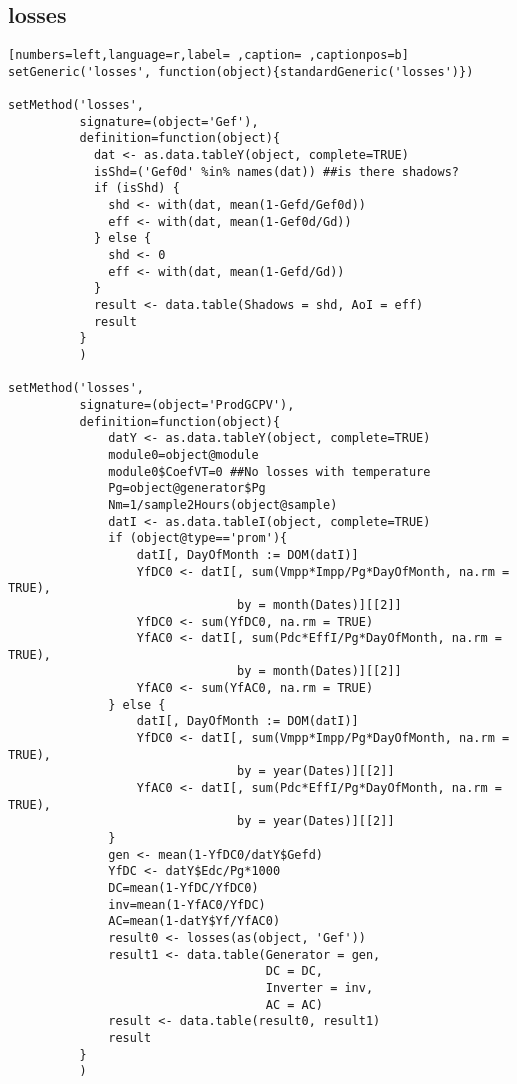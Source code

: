 \subsection{losses}
\label{sec:org82867e5}
\begin{lstlisting}[numbers=left,language=r,label= ,caption= ,captionpos=b]
setGeneric('losses', function(object){standardGeneric('losses')})

setMethod('losses',
          signature=(object='Gef'),
          definition=function(object){
            dat <- as.data.tableY(object, complete=TRUE)
            isShd=('Gef0d' %in% names(dat)) ##is there shadows?
            if (isShd) {
              shd <- with(dat, mean(1-Gefd/Gef0d))
              eff <- with(dat, mean(1-Gef0d/Gd))
            } else {
              shd <- 0
              eff <- with(dat, mean(1-Gefd/Gd))
            }
            result <- data.table(Shadows = shd, AoI = eff)
            result
          }
          )

setMethod('losses',
          signature=(object='ProdGCPV'),
          definition=function(object){
              datY <- as.data.tableY(object, complete=TRUE)
              module0=object@module
              module0$CoefVT=0 ##No losses with temperature
              Pg=object@generator$Pg
              Nm=1/sample2Hours(object@sample)
              datI <- as.data.tableI(object, complete=TRUE)
              if (object@type=='prom'){
                  datI[, DayOfMonth := DOM(datI)]
                  YfDC0 <- datI[, sum(Vmpp*Impp/Pg*DayOfMonth, na.rm = TRUE),
                                by = month(Dates)][[2]]
                  YfDC0 <- sum(YfDC0, na.rm = TRUE)
                  YfAC0 <- datI[, sum(Pdc*EffI/Pg*DayOfMonth, na.rm = TRUE),
                                by = month(Dates)][[2]]
                  YfAC0 <- sum(YfAC0, na.rm = TRUE)
              } else {
                  datI[, DayOfMonth := DOM(datI)]
                  YfDC0 <- datI[, sum(Vmpp*Impp/Pg*DayOfMonth, na.rm = TRUE),
                                by = year(Dates)][[2]]
                  YfAC0 <- datI[, sum(Pdc*EffI/Pg*DayOfMonth, na.rm = TRUE),
                                by = year(Dates)][[2]]     
              }
              gen <- mean(1-YfDC0/datY$Gefd)
              YfDC <- datY$Edc/Pg*1000
              DC=mean(1-YfDC/YfDC0)
              inv=mean(1-YfAC0/YfDC)
              AC=mean(1-datY$Yf/YfAC0)
              result0 <- losses(as(object, 'Gef'))
              result1 <- data.table(Generator = gen,
                                    DC = DC,
                                    Inverter = inv,
                                    AC = AC)
              result <- data.table(result0, result1)
              result
          }
          )


\end{lstlisting}
